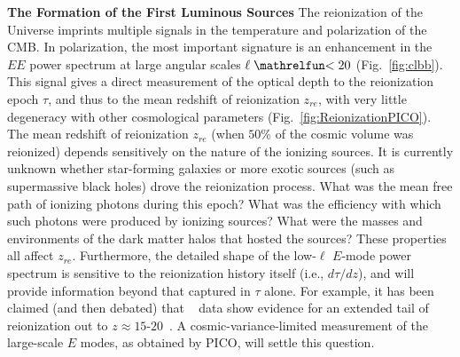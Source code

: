 \documentclass[PICOReport.tex]{subfiles}
\begin{document}

{\bf The Formation of the First Luminous Sources} \hspace{0.1in} \label{luminoussources}  The reionization of the Universe imprints multiple signals in the temperature and polarization of the CMB.  In polarization, the most important signature is an enhancement in the $EE$ power spectrum at large angular scales $\ell \simlt 20$ (Fig.~\ref{fig:clbb}). This signal gives a direct measurement of the optical depth to the reionization epoch $\tau$, and thus to the mean redshift of reionization $z_{re}$, with very little degeneracy with other cosmological parameters (Fig.~\ref{fig:ReionizationPICO}). The mean redshift of reionization $z_{re}$ (when $50$\% of the cosmic volume was reionized) depends sensitively on the nature of the ionizing sources.  It is currently unknown whether star-forming galaxies or more exotic sources (such as supermassive black holes) drove the reionization process.  What was the mean free path of ionizing photons during this epoch?  What was the efficiency with which such photons were produced by ionizing sources?  What were the masses and environments of the dark matter halos that hosted the sources?  These properties all affect $z_{re}$. Furthermore, the detailed shape of the low-$\ell$ $E$-mode power spectrum is sensitive to the reionization history itself (i.e., $d\tau/dz$), and will provide information beyond that captured in $\tau$ alone.  For example, it has been claimed (and then debated) that \planck~ data show evidence for an extended tail of reionization out to $z \approx 15$-$20$~\citep{Miranda2017}.  A cosmic-variance-limited measurement of the large-scale $E$ modes, as obtained by PICO, will settle this question.  
 
\end{document}
